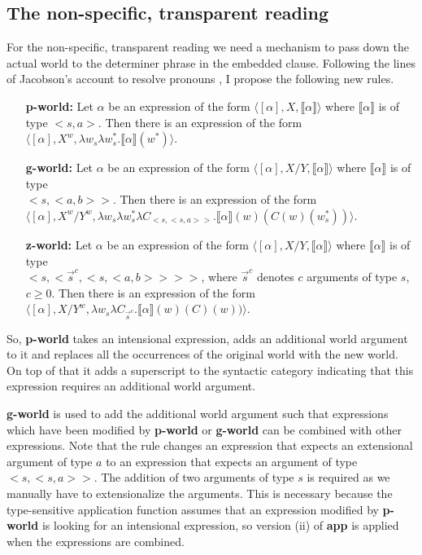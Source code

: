 \documentclass[parskip=half]{scrartcl}
\newcommand{\sem}[1]{\ensuremath{\llbracket#1\rrbracket}}
\begin{document}
\subsection{The non-specific, transparent reading}

For the non-specific, transparent reading we need a mechanism to pass down the actual world to the determiner phrase
in the embedded clause. Following the lines of Jacobson's account to resolve pronouns \cite[Ch.\ 15]{jacobson2014},
I propose the following new rules.

\begin{enumerate}
\item[\textbf{p-world:}] Let $\alpha$  be an expression of the form $\langle [\alpha], X, \sem{\alpha} \rangle$ where $\sem{\alpha}$ is of type $<s,a>$. Then there is an
expression of the form $\langle[\alpha], X^w, \lambda w_s \lambda w_s^*.\sem{\alpha}(w^*)  \rangle$.  
\item[\textbf{g-world:}] Let $\alpha$  be an expression of the form $\langle [\alpha], X/Y, \sem{\alpha} \rangle$ where $\sem{\alpha}$ is of type \\$<s,<a,b>>$. Then there is an
expression of the form \\ $\langle[\alpha], X^w/Y^w, \lambda w_s\lambda w_s^* \lambda C_{<s,<s,a>>} . \sem{\alpha}(w)(C(w)(w_s^*))  \rangle$.  
\item[\textbf{z-world:}] Let $\alpha$  be an expression of the form $\langle [\alpha], X/Y, \sem{\alpha} \rangle$ where $\sem{\alpha}$ is of type \\$<s,<\vec{s}^c,<s,<a,b>>>>$, where $\vec{s}^c$ denotes $c$ arguments of type $s$, $c\ge 0$. Then there is an
expression of the form \\ $\langle[\alpha], X/Y^w, \lambda w_s  \lambda C_{\vec{s}^c}. \sem{\alpha}(w)(C)(w))  \rangle$.
\end{enumerate}


So, \textbf{p-world} takes an intensional expression, adds an additional world argument to it and replaces all the occurrences of the original world with the new world. 
On top of that it adds a superscript to the syntactic category indicating that this expression requires an additional world argument. 

\textbf{g-world} is used to add the
additional world argument such that expressions which have been modified by  \textbf{p-world} or \textbf{g-world}  can be combined with other expressions. Note that the rule changes an expression
that expects an extensional argument of type $a$ to an expression that expects an argument of type $<s,<s,a>>$. The addition of two arguments of type $s$ is required as 
we manually have to extensionalize the arguments. This is necessary because the type-sensitive application function assumes that an expression modified by \textbf{p-world} is looking 
for an intensional expression, so version (ii) of \textbf{app} is applied when the expressions are combined. 
\end{document}
